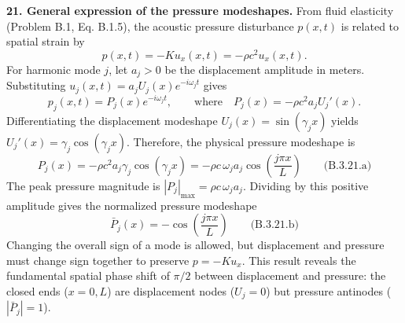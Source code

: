 \textbf{21. General expression of the pressure modeshapes.} From fluid elasticity (Problem B.1, Eq. B.1.5), the acoustic pressure disturbance $p(x,t)$ is related to spatial strain by
\[
p(x,t)=-Ku_x(x,t)=-\rho c^2 u_x(x,t).
\]
For harmonic mode $j$, let $a_j>0$ be the displacement amplitude in meters. Substituting $u_j(x,t)=a_jU_j(x)e^{-i\omega_j t}$ gives
\[
p_j(x,t)=P_j(x)e^{-i\omega_j t},\qquad\text{where}\quad P_j(x)=-\rho c^2 a_j U_j'(x).
\]
Differentiating the displacement modeshape $U_j(x)=\sin(\gamma_j x)$ yields $U_j'(x)=\gamma_j\cos(\gamma_j x)$. Therefore, the physical pressure modeshape is
\[
\boxed{P_j(x)=-\rho c^2 a_j\gamma_j\cos(\gamma_j x)=-\rho c\,\omega_j a_j\cos\left(\frac{j\pi x}{L}\right)}\qquad\text{(B.3.21.a)}
\]
The peak pressure magnitude is $|P_j|_{\max}=\rho c\,\omega_j a_j$. Dividing by this positive amplitude gives the normalized pressure modeshape
\[
\boxed{\bar{P}_j(x)=-\cos\left(\frac{j\pi x}{L}\right)}\qquad\text{(B.3.21.b)}
\]
Changing the overall sign of a mode is allowed, but displacement and pressure must change sign together to preserve $p=-Ku_x$. This result reveals the fundamental spatial phase shift of $\pi/2$ between displacement and pressure: the closed ends ($x=0, L$) are displacement nodes ($U_j=0$) but pressure antinodes ($|\bar{P}_j|=1$).
